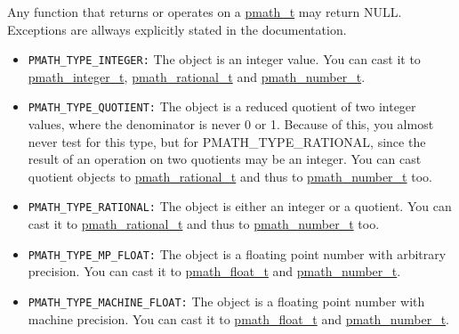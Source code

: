 Any function that returns or operates on a \hyperlink{classpmath__t}{pmath\_\-t} may return NULL. Exceptions are allways explicitly stated in the documentation.

\begin{itemize}
\item {\tt PMATH\_\-TYPE\_\-INTEGER:} The object is an integer value. You can cast it to \hyperlink{classpmath__integer__t}{pmath\_\-integer\_\-t}, \hyperlink{classpmath__rational__t}{pmath\_\-rational\_\-t} and \hyperlink{classpmath__number__t}{pmath\_\-number\_\-t}.\end{itemize}


\begin{itemize}
\item {\tt PMATH\_\-TYPE\_\-QUOTIENT:} The object is a reduced quotient of two integer values, where the denominator is never 0 or 1. Because of this, you almost never test for this type, but for PMATH\_\-TYPE\_\-RATIONAL, since the result of an operation on two quotients may be an integer. You can cast quotient objects to \hyperlink{classpmath__rational__t}{pmath\_\-rational\_\-t} and thus to \hyperlink{classpmath__number__t}{pmath\_\-number\_\-t} too.\end{itemize}


\begin{itemize}
\item {\tt PMATH\_\-TYPE\_\-RATIONAL:} The object is either an integer or a quotient. You can cast it to \hyperlink{classpmath__rational__t}{pmath\_\-rational\_\-t} and thus to \hyperlink{classpmath__number__t}{pmath\_\-number\_\-t} too.\end{itemize}


\begin{itemize}
\item {\tt PMATH\_\-TYPE\_\-MP\_\-FLOAT:} The object is a floating point number with arbitrary precision. You can cast it to \hyperlink{classpmath__float__t}{pmath\_\-float\_\-t} and \hyperlink{classpmath__number__t}{pmath\_\-number\_\-t}.\end{itemize}


\begin{itemize}
\item {\tt PMATH\_\-TYPE\_\-MACHINE\_\-FLOAT:} The object is a floating point number with machine precision. You can cast it to \hyperlink{classpmath__float__t}{pmath\_\-float\_\-t} and \hyperlink{classpmath__number__t}{pmath\_\-number\_\-t}.\end{itemize}


